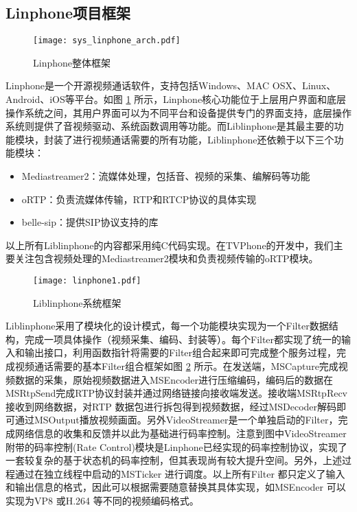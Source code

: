     \subsection{Linphone项目框架}

    \begin{figure}[htbp]
      \centering
      \texttt{[image: sys\_linphone\_arch.pdf]}
      \caption{Linphone整体框架}
      \label{fig:sys_linphone_arch}
    \end{figure}

    Linphone是一个开源视频通话软件，支持包括Windows、MAC OSX、Linux、Android、iOS等平台。如图 \ref{fig:sys_linphone_arch} 所示，Linphone核心功能位于上层用户界面和底层操作系统之间，其用户界面可以为不同平台和设备提供专门的界面支持，底层操作系统则提供了音视频驱动、系统函数调用等功能。而Liblinphone是其最主要的功能模块，封装了进行视频通话需要的所有功能，Liblinphone还依赖于以下三个功能模块：
    \begin{itemize}
        \item Mediastreamer2：流媒体处理，包括音、视频的采集、编解码等功能
        \item oRTP：负责流媒体传输，RTP和RTCP协议的具体实现
        \item belle-sip：提供SIP协议支持的库
    \end{itemize}
    以上所有Liblinphone的内容都采用纯C代码实现。在TVPhone的开发中，我们主要关注包含视频处理的Mediastreamer2模块和负责视频传输的oRTP模块。

    \begin{figure}[htbp]
      \centering
      \texttt{[image: linphone1.pdf]}
      \caption{Liblinphone系统框架}
      \label{fig:linphone1}
    \end{figure}

    Liblinphone采用了模块化的设计模式，每一个功能模块实现为一个Filter数据结构，完成一项具体操作（视频采集、编码、封装等）。每个Filter都实现了统一的输入和输出接口，利用函数指针将需要的Filter组合起来即可完成整个服务过程，完成视频通话需要的基本Filter组合框架如图 \ref{fig:linphone1} 所示。在发送端，MSCapture完成视频数据的采集，原始视频数据进入MSEncoder进行压缩编码，编码后的数据在MSRtpSend完成RTP协议封装并通过网络链接向接收端发送。接收端MSRtpRecv接收到网络数据，对RTP 数据包进行拆包得到视频数据，经过MSDecoder解码即可通过MSOutput播放视频画面。另外VideoStreamer是一个单独启动的Filter，完成网络信息的收集和反馈并以此为基础进行码率控制。注意到图中VideoStreamer附带的码率控制(Rate Control)模块是Linphone已经实现的码率控制协议，实现了一套较复杂的基于状态机的码率控制，但其表现尚有较大提升空间。另外，上述过程通过在独立线程中启动的MSTicker 进行调度。以上所有Filter 都只定义了输入和输出信息的格式，因此可以根据需要随意替换其具体实现，如MSEncoder 可以实现为VP8 或H.264 等不同的视频编码格式。

